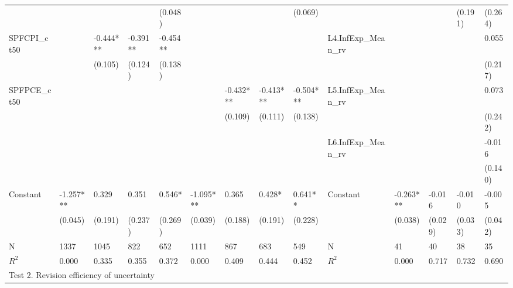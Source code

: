 \documentclass[12pt]{article}
\begin{document}
\begin{table}
\begin{adjustbox}{width={24cm},totalheight={14cm}}
\begin{threeparttable}
\begin{tabular}{llllllllllllll}
					&               &           &          & (0.048)  &               &           &           & (0.069)   &                     &               &          & (0.191)  & (0.264)  \\
					SPFCPI\_ct50        &               & -0.444*** & -0.391** & -0.454** &               &           &           &           & L4.InfExp\_Mean\_rv &               &          &          & 0.055    \\
					&               & (0.105)   & (0.124)  & (0.138)  &               &           &           &           &                     &               &          &          & (0.217)  \\
					SPFPCE\_ct50        &               &           &          &          &               & -0.432*** & -0.413*** & -0.504*** & L5.InfExp\_Mean\_rv &               &          &          & 0.073    \\
					&               &           &          &          &               & (0.109)   & (0.111)   & (0.138)   &                     &               &          &          & (0.242)  \\
					&               &           &          &          &               &           &           &           & L6.InfExp\_Mean\_rv &               &          &          & -0.016   \\
					&               &           &          &          &               &           &           &           &                     &               &          &          & (0.140)  \\
					Constant               & -1.257***     & 0.329     & 0.351    & 0.546*   & -1.095***     & 0.365     & 0.428*    & 0.641**   & Constant               & -0.263***     & -0.016   & -0.010   & -0.005   \\
					& (0.045)       & (0.191)   & (0.237)  & (0.269)  & (0.039)       & (0.188)   & (0.191)   & (0.228)   &                     & (0.038)       & (0.029)  & (0.033)  & (0.042)  \\
					\hline 
					N                   & 1337          & 1045      & 822      & 652      & 1111          & 867       & 683       & 549       & N                   & 41            & 40       & 38       & 35       \\
					$R^2$               & 0.000         & 0.335     & 0.355    & 0.372    & 0.000         & 0.409     & 0.444     & 0.452     & $R^2$               & 0.000         & 0.717    & 0.732    & 0.690    \\
					\hline 
					\multicolumn{14}{l}{Test 2. Revision efficiency of uncertainty}             \\

\end{tabular}
\end{threeparttable}
\end{adjustbox}
\end{table}
\end{document}
